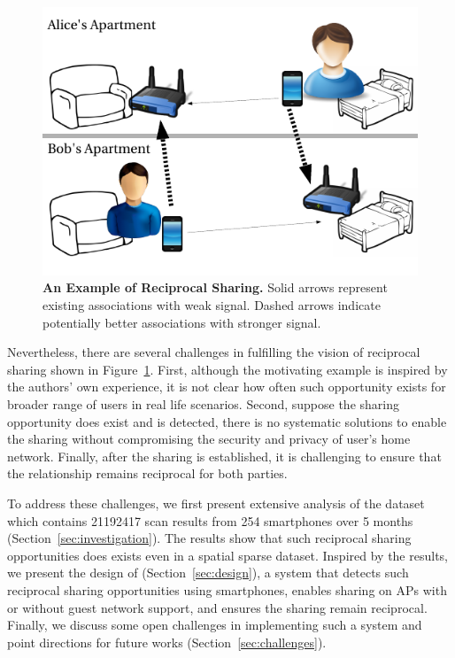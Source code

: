 \begin{figure}[t]
  \centering
  \includegraphics[width=\columnwidth]{./figures/motivation.pdf}
  \caption{\textbf{An Example of Reciprocal \wifi{} Sharing.} Solid arrows
    represent existing associations with weak signal. Dashed arrows indicate
  potentially better associations with stronger \wifi{} signal.}
  \label{fig:motivation}
\end{figure}

Nevertheless, there are several challenges in fulfilling the vision of
reciprocal \wifi{} sharing shown in Figure~\ref{fig:motivation}. First, although
the motivating example is inspired by the authors' own experience, it is not
clear how often such opportunity exists for broader range of users in real life
scenarios. Second, suppose the sharing opportunity does exist and is detected,
there is no systematic solutions to enable the \wifi{} sharing without
compromising the security and privacy of user's home network. Finally, after the
\wifi{} sharing is established, it is challenging to ensure that the
relationship remains reciprocal for both parties.

To address these challenges, we first present extensive analysis of the
\PhoneLab{} \wifi{} dataset which contains \num{21192417} scan results from 254
smartphones over 5 months (Section~\ref{sec:investigation}). The results show
that such reciprocal \wifi{} sharing opportunities does exists even in a spatial
sparse dataset. Inspired by the results, we present the design of \wisefi{}
(Section~\ref{sec:design}), a system that detects such reciprocal \wifi{}
sharing opportunities using smartphones, enables \wifi{} sharing on APs with or
without guest network support, and ensures the sharing remain reciprocal.
Finally, we discuss some open challenges in implementing such a system and point
directions for future works (Section~\ref{sec:challenges}).
